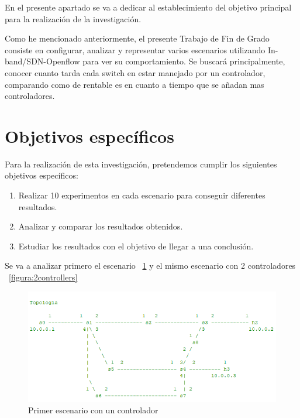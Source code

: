 \documentclass[a4paper, 12pt]{book}
\begin{document}
	En el presente apartado se va a dedicar al establecimiento del objetivo principal para la realización de la investigación. 
	
	Como he mencionado anteriormente, el presente Trabajo de Fin de Grado consiste en configurar, analizar y representar varios escenarios utilizando In-band/SDN-Openflow para ver su comportamiento. Se buscará principalmente, conocer cuanto tarda cada switch en estar manejado por un controlador, comparando como de rentable es en cuanto a tiempo que se añadan mas controladores.
	
	
	\section{Objetivos específicos}
	\label{sec:objetivos-especificos}
	
	Para la realización de esta investigación, pretendemos cumplir los siguientes objetivos específicos: 
	
	\begin{enumerate}
		\item 	Realizar 10 experimentos en cada escenario para conseguir diferentes resultados.
		\item  	Analizar y comparar los resultados obtenidos.
		\item 	Estudiar los resultados con el objetivo de llegar a una conclusión.
		
	\end{enumerate}
	
 	Se va a analizar primero el escenario ~\ref{figura:bucle4} y el mismo escenario con 2 controladores ~\ref{figura:2controllers}
	
		\begin{figure}
			\centering
			\includegraphics[width=16cm, keepaspectratio]{img/bucle4}
			\caption{Primer escenario con un controlador}
			\label{figura:bucle4}
		\end{figure}
	
\end{document}
